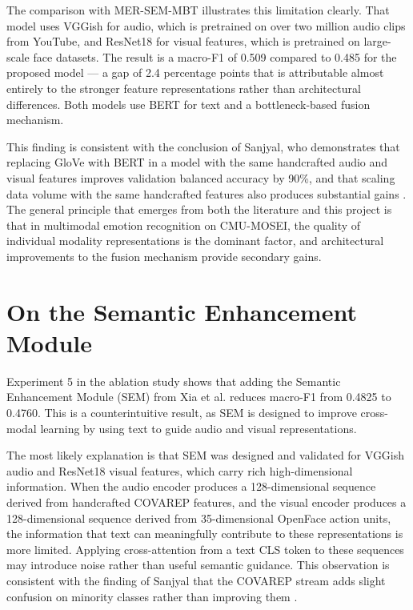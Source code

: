 The comparison with MER-SEM-MBT \cite{xia2022multimodal} illustrates this limitation clearly. That model uses VGGish for audio, which is pretrained on over two million audio clips from YouTube, and ResNet18 for visual features, which is pretrained on large-scale face datasets. The result is a macro-F1 of 0.509 compared to 0.485 for the proposed model — a gap of 2.4 percentage points that is attributable almost entirely to the stronger feature representations rather than architectural differences. Both models use BERT for text and a bottleneck-based fusion mechanism.

This finding is consistent with the conclusion of Sanjyal, who demonstrates that replacing GloVe with BERT in a model with the same handcrafted audio and visual features improves validation balanced accuracy by 90\%, and that scaling data volume with the same handcrafted features also produces substantial gains \cite{sanjyal2026affectdiff}. The general principle that emerges from both the literature and this project is that in multimodal emotion recognition on CMU-MOSEI, the quality of individual modality representations is the dominant factor, and architectural improvements to the fusion mechanism provide secondary gains.

\section{On the Semantic Enhancement Module}

Experiment 5 in the ablation study shows that adding the Semantic Enhancement Module (SEM) from Xia et al. \cite{xia2022multimodal} reduces macro-F1 from 0.4825 to 0.4760. This is a counterintuitive result, as SEM is designed to improve cross-modal learning by using text to guide audio and visual representations.

The most likely explanation is that SEM was designed and validated for VGGish audio and ResNet18 visual features, which carry rich high-dimensional information. When the audio encoder produces a 128-dimensional sequence derived from handcrafted COVAREP features, and the visual encoder produces a 128-dimensional sequence derived from 35-dimensional OpenFace action units, the information that text can meaningfully contribute to these representations is more limited. Applying cross-attention from a text CLS token to these sequences may introduce noise rather than useful semantic guidance. This observation is consistent with the finding of Sanjyal that the COVAREP stream adds slight confusion on minority classes rather than improving them \cite{sanjyal2026affectdiff}.

